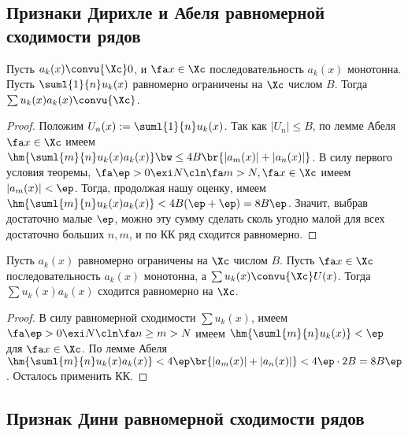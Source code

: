 \documentclass[a4paper]{article}
\begin{document}
\subsection{Признаки Дирихле и Абеля равномерной сходимости рядов}

\begin{theorem}
Пусть $a_k(x)\convu{\Xc}0$, и $\fa x \in \Xc$ последовательность $a_k(x)$ монотонна. Пусть $\suml{1}{n} u_k(x)$ равномерно
ограничены на $\Xc$ числом $B$. Тогда $\sum u_k(x)a_k(x)\convu{\Xc}$.
\end{theorem}
\begin{proof}
Положим $U_n(x) := \suml{1}{n}u_k(x)$. Так как $|U_n| \le B$, по лемме Абеля $\fa x \in \Xc$ имеем
$\hm{\suml{m}{n}u_k(x)a_k(x)} \bw\le 4B\br{|a_m(x)| + |a_n(x)|}$.
В силу первого условия теоремы, $\fa \ep > 0 \exi N\cln \fa m>N, \fa x \in \Xc$ имеем $|a_m(x)| < \ep$. Тогда, продолжая нашу оценку,
имеем $\hm{\suml{m}{n}u_k(x)a_k(x)} < 4B(\ep + \ep) = 8B\ep$. Значит, выбрав достаточно малые $\ep$, можно эту сумму сделать
сколь угодно малой для всех достаточно больших $n,m$, и по КК ряд сходится равномерно.
\end{proof}

\begin{theorem}
Пусть $a_k(x)$ равномерно ограничены на $\Xc$ числом $B$. Пусть $\fa x \in \Xc$ последовательность
$a_k(x)$ монотонна, а $\sum u_k(x)\convu{\Xc}U(x)$. Тогда $\sum u_k(x)a_k(x)$ сходится равномерно на $\Xc$.
\end{theorem}
\begin{proof}
В силу равномерной сходимости $\sum u_k(x)$, имеем $\fa \ep > 0 \exi N\cln \fa n \ge m > N$ имеем $\hm{\suml{m}{n} u_k(x)} <\ep$ для
$\fa x \in \Xc$. По лемме Абеля $\hm{\suml{m}{n} u_k(x)a_k(x)} < 4\ep\br{|a_m(x)| + |a_n(x)|}< 4\ep \cdot 2B=8B\ep$. Осталось применить КК.
\end{proof}

\subsection{Признак Дини равномерной сходимости рядов}
\end{document}
